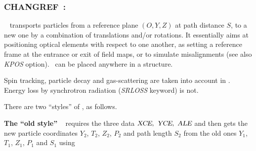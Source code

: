 \newpage

\subsubsection*{CHANGREF~: \CHANGREFTitl} \label{CHANGREF}
\medskip 

\noindent \CHANGREF\        
transports  particles from a reference plane  $(O,Y,Z)$  at path distance $S$, to a new one by a combination of 
translations and/or rotations.  It essentially aims at positioning optical elements with respect 
to one another, 
as setting a reference frame at the entrance
or exit of field maps, or to simulate misalignments (see also  \textsl{KPOS} option).  
 \CHANGREF\      can be placed anywhere in a structure. 

\medskip

\noindent  Spin tracking, 
particle decay and gas-scattering are taken into account in  \CHANGREF. 
Energy loss by synchrotron radiation (\textsl{SRLOSS} keyword) is not. 

\medskip

\noindent There are two ``styles'' of \CHANGREF, as follows.

\bigskip

\noindent \textbf{ The ``old style'' \CHANGREF}~    \label{CHANGREFOld}  
requires the three data $\textsl{XCE}, ~ \textsl{YCE}, ~ \textsl{ALE}$ and then 
 gets the  new particle coordinates  $ Y_2$,  $ T_2$,  $ Z_2$, 
$ P_2 $  and path length $ S_2 $  from the old ones  $ Y_1$,   
$ T_1$,  $ Z_1$,  $ P_1 $ and $ S_1 $ using

